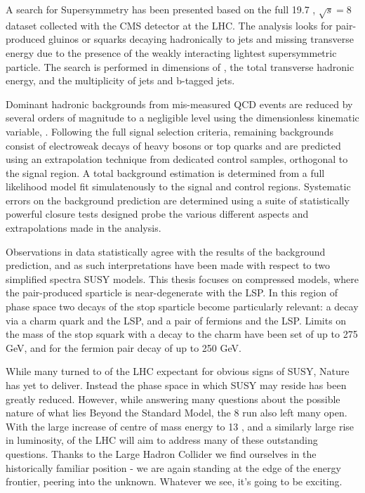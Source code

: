 
A search for Supersymmetry has been presented based on the full 19.7 \fb, 
$\sqrt{s} = 8$ \tev dataset collected with the CMS detector at the LHC. The
analysis looks for pair-produced gluinos or squarks decaying hadronically to
jets and missing transverse energy due to the presence of the weakly interacting
lightest supersymmetric particle. The search is performed in dimensions of \HT,
the total transverse hadronic energy, and the multiplicity of jets and b-tagged
jets.

Dominant hadronic backgrounds from mis-measured QCD events are reduced by
several orders of magnitude to a negligible level using the dimensionless
kinematic variable, \alphat. Following the full signal selection criteria,
remaining backgrounds consist of electroweak decays of
heavy bosons or top quarks and are predicted using an extrapolation technique
from dedicated control samples,
orthogonal to the signal region. A total background estimation is determined
from a full likelihood model fit simulatenously to the signal and control
regions. Systematic errors on the background prediction are determined using a
suite of statistically powerful closure tests designed probe the various
different aspects and extrapolations made in the analysis.

Observations in data statistically agree with the results of the background
prediction, and as such interpretations have been made with respect to two
simplified spectra SUSY models. This thesis focuses on compressed models, where
the pair-produced sparticle is near-degenerate with the LSP. In this region of
phase space two decays of the stop sparticle become particularly relevant: a
decay via a charm quark and the LSP, and a pair of fermions and the LSP. Limits
on the mass of the stop squark with a decay to the charm have been set of up to
275 GeV, and for the fermion pair decay of up to 250 GeV.

While many turned to \runone of the LHC expectant for obvious signs of SUSY,
Nature has yet to deliver. Instead the phase space in which SUSY may
reside has been greatly reduced.
However, while answering many questions about the possible
nature of what lies Beyond the Standard Model, the 8
\tev run also left many open. With the
large increase of centre of mass energy to 13 \tev, and a similarly large
rise in luminosity, \runtwo of the LHC will aim to address many of these
outstanding questions. Thanks to the Large Hadron Collider we find ourselves in
the historically familiar position - we are again standing at the edge of
the energy frontier, peering into the unknown. Whatever we see, it's going to be
exciting.
